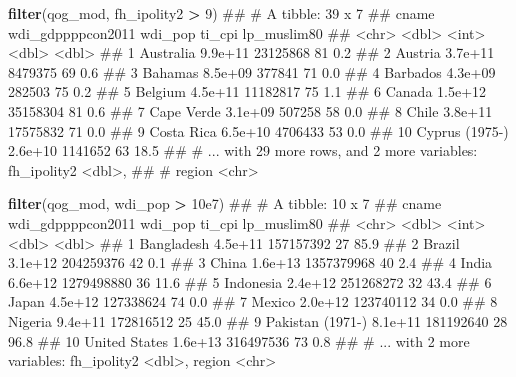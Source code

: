 \documentclass[]{book}
\newenvironment{Shaded}{\begin{snugshade}}{\end{snugshade}}
\newcommand{\KeywordTok}[1]{\textcolor[rgb]{0.13,0.29,0.53}{\textbf{#1}}}
\newcommand{\DecValTok}[1]{\textcolor[rgb]{0.00,0.00,0.81}{#1}}
\newcommand{\FloatTok}[1]{\textcolor[rgb]{0.00,0.00,0.81}{#1}}
\newcommand{\StringTok}[1]{\textcolor[rgb]{0.31,0.60,0.02}{#1}}
\newcommand{\OperatorTok}[1]{\textcolor[rgb]{0.81,0.36,0.00}{\textbf{#1}}}
\newcommand{\NormalTok}[1]{#1}
\begin{document}
\begin{Shaded}
\begin{Highlighting}[]
\KeywordTok{filter}\NormalTok{(qog_mod, fh_ipolity2 }\OperatorTok{>}\StringTok{ }\DecValTok{9}\NormalTok{)}
\NormalTok{## # A tibble: 39 x 7}
\NormalTok{##             cname wdi_gdppppcon2011  wdi_pop ti_cpi lp_muslim80}
\NormalTok{##             <chr>             <dbl>    <int>  <dbl>       <dbl>}
\NormalTok{##  1      Australia           9.9e+11 23125868     81         0.2}
\NormalTok{##  2        Austria           3.7e+11  8479375     69         0.6}
\NormalTok{##  3        Bahamas           8.5e+09   377841     71         0.0}
\NormalTok{##  4       Barbados           4.3e+09   282503     75         0.2}
\NormalTok{##  5        Belgium           4.5e+11 11182817     75         1.1}
\NormalTok{##  6         Canada           1.5e+12 35158304     81         0.6}
\NormalTok{##  7     Cape Verde           3.1e+09   507258     58         0.0}
\NormalTok{##  8          Chile           3.8e+11 17575832     71         0.0}
\NormalTok{##  9     Costa Rica           6.5e+10  4706433     53         0.0}
\NormalTok{## 10 Cyprus (1975-)           2.6e+10  1141652     63        18.5}
\NormalTok{## # ... with 29 more rows, and 2 more variables: fh_ipolity2 <dbl>,}
\NormalTok{## #   region <chr>}

\KeywordTok{filter}\NormalTok{(qog_mod, wdi_pop }\OperatorTok{>}\StringTok{ }\FloatTok{10e7}\NormalTok{)}
\NormalTok{## # A tibble: 10 x 7}
\NormalTok{##               cname wdi_gdppppcon2011    wdi_pop ti_cpi lp_muslim80}
\NormalTok{##               <chr>             <dbl>      <int>  <dbl>       <dbl>}
\NormalTok{##  1       Bangladesh           4.5e+11  157157392     27        85.9}
\NormalTok{##  2           Brazil           3.1e+12  204259376     42         0.1}
\NormalTok{##  3            China           1.6e+13 1357379968     40         2.4}
\NormalTok{##  4            India           6.6e+12 1279498880     36        11.6}
\NormalTok{##  5        Indonesia           2.4e+12  251268272     32        43.4}
\NormalTok{##  6            Japan           4.5e+12  127338624     74         0.0}
\NormalTok{##  7           Mexico           2.0e+12  123740112     34         0.0}
\NormalTok{##  8          Nigeria           9.4e+11  172816512     25        45.0}
\NormalTok{##  9 Pakistan (1971-)           8.1e+11  181192640     28        96.8}
\NormalTok{## 10    United States           1.6e+13  316497536     73         0.8}
\NormalTok{## # ... with 2 more variables: fh_ipolity2 <dbl>, region <chr>}


\end{Highlighting}
\end{Shaded}
\end{document}
